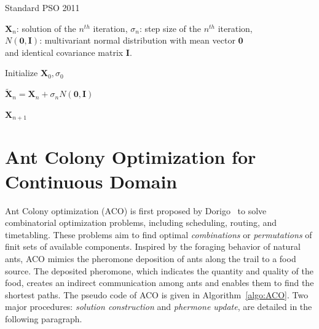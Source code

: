 \begin{algorithm}%
\caption{Standard PSO 2011}\label{algo:SPSO2011}

$\boldsymbol{X}_{n}$: solution of the $n^{th}$ iteration, $\sigma_n$: step size of the $n^{th}$ iteration, \\
$N(\boldsymbol{0}, \boldsymbol{I})$: multivariant normal distribution with mean vector $\boldsymbol{0}$ \\ 
and identical covariance matrix $\boldsymbol{I}$.

\BlankLine
{} 

\BlankLine
Initialize $\boldsymbol{X}_0, \sigma_0$ \\
 {

    $\widetilde{\boldsymbol{X}}_n = \boldsymbol{X}_n + \sigma_n N(\boldsymbol{0}, \boldsymbol{I})$  \\

}

\Return $\boldsymbol{X}_{n+1}$

\end{algorithm}




\section{Ant Colony Optimization for Continuous Domain}

Ant Colony optimization (ACO) is first proposed by Dorigo~\cite{Dorigo:1999:ACO} to solve combinatorial optimization problems, including scheduling, routing, and timetabling.
These problems aim to find optimal \textit{combinations} or \textit{permutations} of finit sets of available components.
Inspired by the foraging behavior of natural ants, ACO mimics the pheromone deposition of ants along the trail to a food source.
The deposited pheromone, which indicates the quantity and quality of the food, creates an indirect communication among ants and enables them to find the shortest paths.
The pseudo code of ACO is given in Algorithm~\ref{algo:ACO}.
Two major procedures: \textit{solution construction} and \textit{phermone update}, are detailed in the following paragraph.


